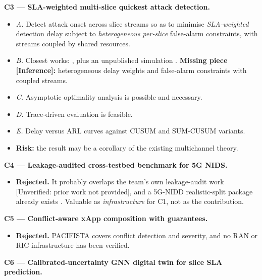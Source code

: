 \textbf{C3 --- SLA-weighted multi-slice quickest attack detection.}

\begin{itemize}
\tightlist
\item
  \emph{A.} Detect attack onset across slice streams so as to minimise
  \emph{SLA-weighted} detection delay subject to \emph{heterogeneous
  per-slice} false-alarm constraints, with streams coupled by shared
  resources.
\item
  \emph{B.} Closest works:
  \citep{tartakovsky2006novel, fellouris2016second}, plus an unpublished
  simulation \citep{qcdslice_github}. \textbf{Missing piece
  {[}Inference{]}:} heterogeneous delay weights and false-alarm
  constraints with coupled streams.
\item
  \emph{C.} Asymptotic optimality analysis is possible and necessary.
\item
  \emph{D.} Trace-driven evaluation is feasible.
\item
  \emph{E.} Delay versus ARL curves against CUSUM and SUM-CUSUM
  variants.
\item
  \textbf{Risk:} the result may be a corollary of the existing
  multichannel theory.
\end{itemize}

\textbf{C4 --- Leakage-audited cross-testbed benchmark for 5G NIDS.}

\begin{itemize}
\tightlist
\item
  \textbf{Rejected.} It probably overlaps the team's own leakage-audit
  work {[}Unverified: prior work not provided{]}, and a 5G-NIDD
  realistic-split package already exists \citep{tvquynh2026repro}.
  Valuable as \emph{infrastructure} for C1, not as the contribution.
\end{itemize}

\textbf{C5 --- Conflict-aware xApp composition with guarantees.}

\begin{itemize}
\tightlist
\item
  \textbf{Rejected.} PACIFISTA \citep{brachdelprever2025pacifista}
  covers conflict detection and severity, and no RAN or RIC
  infrastructure has been verified.
\end{itemize}

\textbf{C6 --- Calibrated-uncertainty GNN digital twin for slice SLA
prediction.}

